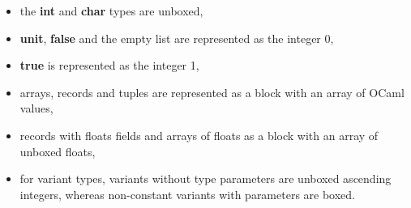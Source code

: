 \begin{itemize}
    \item the \textbf{int} and \textbf{char} types are unboxed,
    \item \textbf{unit}, \textbf{false} and the empty list are represented as the integer 0,
    \item \textbf{true} is represented as the integer 1,
    \item arrays, records and tuples are represented as a block with an array of OCaml values,
    \item records with floats fields and arrays of floats as a block with an
        array of unboxed floats,
    \item for variant types, variants without type parameters are unboxed ascending
integers, whereas non-constant variants with parameters are boxed.
\end{itemize}


